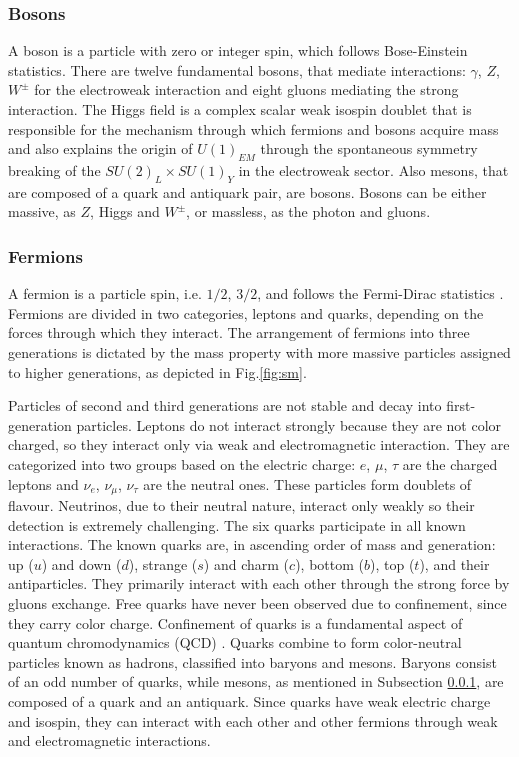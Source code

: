 \subsubsection{Bosons}\label{bosons}
A boson is a particle with zero or integer spin, which follows Bose-Einstein statistics.
There are twelve fundamental bosons, that mediate interactions: $\gamma$, $Z$, $W^{\pm}$
for the electroweak interaction and eight gluons mediating the strong interaction.
The Higgs field is a complex scalar weak isospin doublet that is 
responsible for the mechanism through which fermions and
bosons acquire mass and also explains the origin of $U (1)_{EM}$ 
through the spontaneous
symmetry breaking of the $SU (2)_L \times SU (1)_Y$ in the 
electroweak sector. Also mesons, that are composed of a quark 
and antiquark pair, are bosons. Bosons can be either massive, as $Z$, 
Higgs and $W^{\pm}$, or massless, as the photon and gluons.

\subsubsection{Fermions}
A fermion is a particle  spin,
i.e. $1/2$, $3/2$, and follows the Fermi-Dirac statistics . 
 Fermions are divided in two categories, leptons and quarks, depending 
on the forces through which they interact.  The arrangement of fermions into three generations is dictated by the mass property 
with more massive particles assigned to higher generations, as 
depicted in Fig.\ref{fig:sm}.

Particles of second and third generations are not stable and decay into first-generation 
particles. Leptons do not interact strongly because they are not color charged, so they interact only via 
weak and electromagnetic interaction. They are categorized into 
two groups based on the electric charge: $e$, $\mu$, $\tau$ 
are the charged leptons and $\nu_e$, $\nu_{\mu}$, $\nu_{\tau}$ 
are the neutral ones. These particles form doublets of flavour. 
Neutrinos, due to their neutral nature, interact only weakly so 
their detection is extremely challenging. The six quarks 
participate in all known interactions. The known quarks are, 
in ascending order of mass and generation: up ($u$) and down 
($d$), strange ($s$) and charm ($c$), bottom ($b$), top ($t$), 
and their antiparticles. They primarily interact with each 
other through the strong force by gluons exchange. Free quarks 
have never been observed due to confinement, since they carry 
color charge. Confinement of quarks is a fundamental aspect of 
quantum chromodynamics (QCD) .
Quarks combine to form color-neutral 
particles known as hadrons, classified into baryons and mesons. 
Baryons consist of an odd number of quarks, while mesons, 
as mentioned in Subsection \ref{bosons}, are composed of a quark 
and an antiquark. Since quarks have weak electric charge and 
isospin, they can interact with each other and other fermions 
through weak and electromagnetic interactions.

